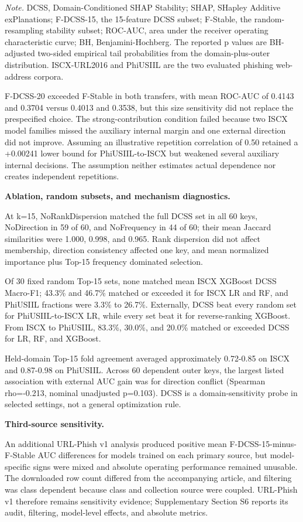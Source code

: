 \documentclass[
  10pt,
]{article}
\begin{document}
\emph{Note.} DCSS, Domain-Conditioned SHAP Stability; SHAP, SHapley
Additive exPlanations; F-DCSS-15, the 15-feature DCSS subset; F-Stable,
the random-resampling stability subset; ROC-AUC, area under the receiver
operating characteristic curve; BH, Benjamini-Hochberg. The reported p
values are BH-adjusted two-sided empirical tail probabilities from the
domain-plus-outer distribution. ISCX-URL2016 and PhiUSIIL are the two
evaluated phishing web-address corpora.

F-DCSS-20 exceeded F-Stable in both transfers, with mean ROC-AUC of
0.4143 and 0.3704 versus 0.4013 and 0.3538, but this size sensitivity
did not replace the prespecified choice. The strong-contribution
condition failed because two ISCX model families missed the auxiliary
internal margin and one external direction did not improve. Assuming an
illustrative repetition correlation of 0.50 retained a +0.00241 lower
bound for PhiUSIIL-to-ISCX but weakened several auxiliary internal
decisions. The assumption neither estimates actual dependence nor
creates independent repetitions.

\textbf{Ablation, random subsets, and mechanism diagnostics.}

At k=15, NoRankDispersion matched the full DCSS set in all 60 keys,
NoDirection in 59 of 60, and NoFrequency in 44 of 60; their mean Jaccard
similarities were 1.000, 0.998, and 0.965. Rank dispersion did not
affect membership, direction consistency affected one key, and mean
normalized importance plus Top-15 frequency dominated selection.

Of 30 fixed random Top-15 sets, none matched mean ISCX XGBoost DCSS
Macro-F1; 43.3\% and 46.7\% matched or exceeded it for ISCX LR and RF,
and PhiUSIIL fractions were 3.3\% to 26.7\%. Externally, DCSS beat every
random set for PhiUSIIL-to-ISCX LR, while every set beat it for
reverse-ranking XGBoost. From ISCX to PhiUSIIL, 83.3\%, 30.0\%, and
20.0\% matched or exceeded DCSS for LR, RF, and XGBoost.

Held-domain Top-15 fold agreement averaged approximately 0.72-0.85 on
ISCX and 0.87-0.98 on PhiUSIIL. Across 60 dependent outer keys, the
largest listed association with external AUC gain was for direction
conflict (Spearman rho=-0.213, nominal unadjusted p=0.103). DCSS is a
domain-sensitivity probe in selected settings, not a general
optimization rule.

\textbf{Third-source sensitivity.}

An additional URL-Phish v1 analysis produced positive mean
F-DCSS-15-minus-F-Stable AUC differences for models trained on each
primary source, but model-specific signs were mixed and absolute
operating performance remained unusable. The downloaded row count
differed from the accompanying article, and filtering was class
dependent because class and collection source were coupled. URL-Phish v1
therefore remains sensitivity evidence; Supplementary Section S6 reports
its audit, filtering, model-level effects, and absolute metrics.
\end{document}
